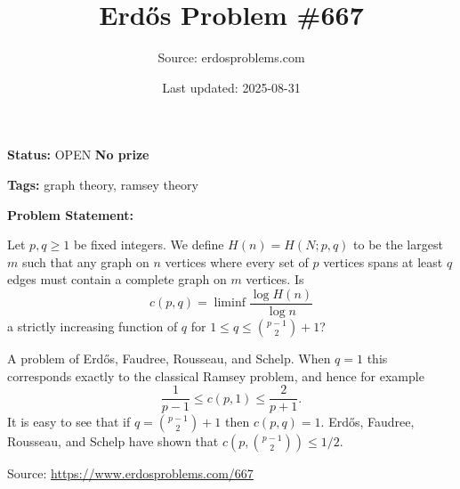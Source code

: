 \documentclass{article}
\title{Erd\H{o}s Problem \#667}
\date{Last updated: 2025-08-31}
\author{Source: erdosproblems.com}
\begin{document}
\maketitle

\noindent\textbf{Status:} OPEN \quad \textbf{No prize}

\noindent\textbf{Tags:} graph theory, ramsey theory

\medskip

\noindent\textbf{Problem Statement:}

Let $p,q\geq 1$ be fixed integers. We define $H(n)=H(N;p,q)$ to be the largest $m$ such that any graph on $n$ vertices where every set of $p$ vertices spans at least $q$ edges must contain a complete graph on $m$ vertices. Is\[c(p,q)=\liminf \frac{\log H(n)}{\log n}\]a strictly increasing function of $q$ for $1\leq q\leq \binom{p-1}{2}+1$?




A problem of Erd\H{o}s, Faudree, Rousseau, and Schelp. When $q=1$ this corresponds exactly to the classical Ramsey problem, and hence for example\[\frac{1}{p-1}\leq c(p,1) \leq \frac{2}{p+1}.\]It is easy to see that if $q=\binom{p-1}{2}+1$ then $c(p,q)=1$. Erd\H{o}s, Faudree, Rousseau, and Schelp have shown that $c(p,\binom{p-1}{2})\leq 1/2$.


\bigskip
\noindent\small{Source: \url{https://www.erdosproblems.com/667}}
\end{document}

